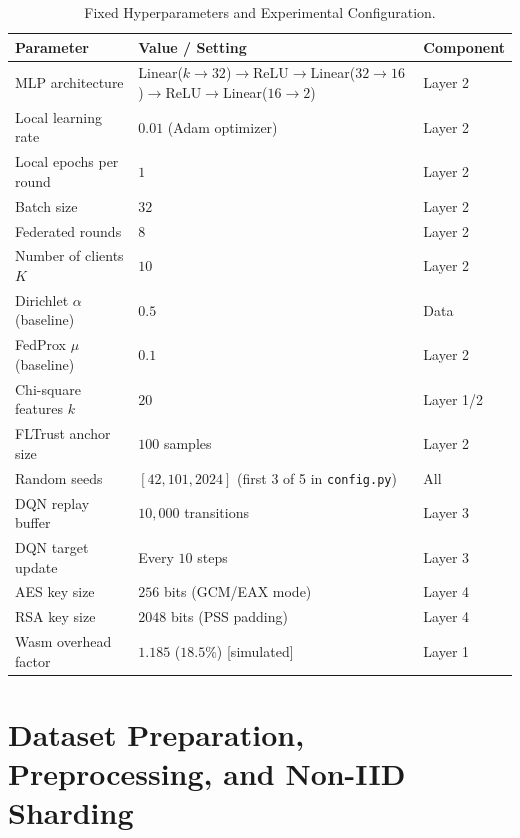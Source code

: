 \documentclass[11pt,a4paper]{article}
\newcommand{\bigsection}[1]{\FloatBarrier\Needspace*{0.22\textheight}\section{#1}}
\begin{document}
\begin{table}[htbp]
\centering
\caption{Fixed Hyperparameters and Experimental Configuration.}
\label{tab:hyperparams}
\small
\begin{tabularx}{\textwidth}{lYl}
\toprule
\textbf{Parameter} & \textbf{Value / Setting} & \textbf{Component} \\
\midrule
MLP architecture & Linear($k{\to}32$)$\to$ReLU$\to$Linear($32{\to}16$)$\to$ReLU$\to$Linear($16{\to}2$) & Layer 2 \\
Local learning rate & $0.01$ (Adam optimizer) & Layer 2 \\
Local epochs per round & $1$ & Layer 2 \\
Batch size & $32$ & Layer 2 \\
Federated rounds & $8$ & Layer 2 \\
Number of clients $K$ & $10$ & Layer 2 \\
Dirichlet $\alpha$ (baseline) & $0.5$ & Data \\
FedProx $\mu$ (baseline) & $0.1$ & Layer 2 \\
Chi-square features $k$ & $20$ & Layer 1/2 \\
FLTrust anchor size & $100$ samples & Layer 2 \\
Random seeds & $[42, 101, 2024]$ (first 3 of 5 in \texttt{config.py}) & All \\
DQN replay buffer & $10{,}000$ transitions & Layer 3 \\
DQN target update & Every $10$ steps & Layer 3 \\
AES key size & $256$ bits (GCM/EAX mode) & Layer 4 \\
RSA key size & $2048$ bits (PSS padding) & Layer 4 \\
Wasm overhead factor & $1.185$ ($18.5\%$) [simulated] & Layer 1 \\
\bottomrule
\end{tabularx}
\end{table}
\FloatBarrier

\bigsection{Dataset Preparation, Preprocessing, and Non-IID Sharding}\label{sec:data}
\end{document}
